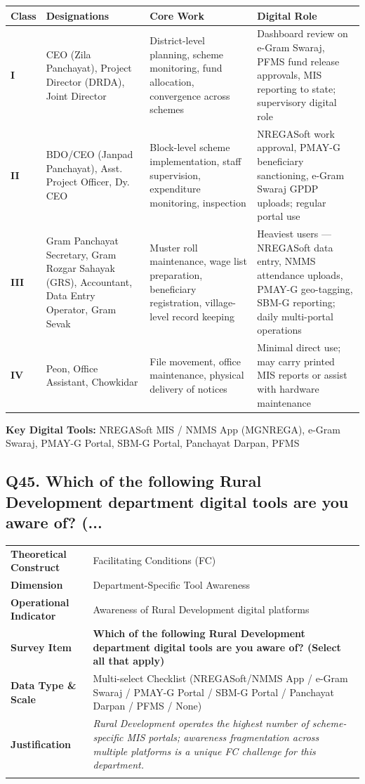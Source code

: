 \documentclass[11pt,a4paper]{article}
\makeatletter
\newcommand{\qcard}[8]{%
\noindent\begin{tabularx}{\textwidth}{@{}>{\columncolor{#7}\bfseries\small}L{3.2cm}|X@{}}
\arrayrulecolor{#8}\hline
Theoretical Construct & #1 \\
Dimension & #2 \\
Operational Indicator & #3 \\
\arrayrulecolor{gold}\hline
\rowcolor{white}\textbf{\color{#8}Survey Item} & \textbf{\color{#8}#4} \\
\arrayrulecolor{gold}\hline
Data Type \& Scale & #5 \\
Justification & \textit{#6} \\
\arrayrulecolor{#8}\hline
\end{tabularx}\vspace{10pt}
}
\makeatother
\begin{document}
\begin{table}[H]\centering\small
\begin{tabularx}{\textwidth}{L{1.2cm} L{3.5cm} L{4.5cm} X}
\toprule
\textbf{Class} & \textbf{Designations} & \textbf{Core Work} & \textbf{Digital Role} \\
\midrule
\textbf{I} & CEO (Zila Panchayat), Project Director (DRDA), Joint Director & District-level planning, scheme monitoring, fund allocation, convergence across schemes & Dashboard review on e-Gram Swaraj, PFMS fund release approvals, MIS reporting to state; supervisory digital role \\[4pt]
\textbf{II} & BDO/CEO (Janpad Panchayat), Asst. Project Officer, Dy. CEO & Block-level scheme implementation, staff supervision, expenditure monitoring, inspection & NREGASoft work approval, PMAY-G beneficiary sanctioning, e-Gram Swaraj GPDP uploads; regular portal use \\[4pt]
\textbf{III} & Gram Panchayat Secretary, Gram Rozgar Sahayak (GRS), Accountant, Data Entry Operator, Gram Sevak & Muster roll maintenance, wage list preparation, beneficiary registration, village-level record keeping & Heaviest users --- NREGASoft data entry, NMMS attendance uploads, PMAY-G geo-tagging, SBM-G reporting; daily multi-portal operations \\[4pt]
\textbf{IV} & Peon, Office Assistant, Chowkidar & File movement, office maintenance, physical delivery of notices & Minimal direct use; may carry printed MIS reports or assist with hardware maintenance \\
\bottomrule
\end{tabularx}
\end{table}

\textbf{Key Digital Tools:} NREGASoft MIS / NMMS App (MGNREGA), e-Gram Swaraj, PMAY-G Portal, SBM-G Portal, Panchayat Darpan, PFMS

\subsection*{Q45. Which of the following Rural Development department digital tools are you aware of? (...}
\qcard{Facilitating Conditions (FC)}{Department-Specific Tool Awareness}{Awareness of Rural Development digital platforms}{Which of the following Rural Development department digital tools are you aware of? (Select all that apply)}{Multi-select Checklist (NREGASoft/NMMS App / e-Gram Swaraj / PMAY-G Portal / SBM-G Portal / Panchayat Darpan / PFMS / None)}{Rural Development operates the highest number of scheme-specific MIS portals; awareness fragmentation across multiple platforms is a unique FC challenge for this department.}{rdbg}{rdcol}
\end{document}
